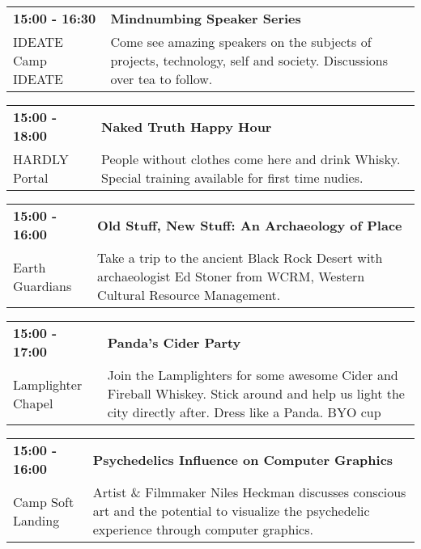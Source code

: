 \begin{tabular}{ p{1in} p{2.2in} }
    \textbf{15:00 - 16:30} & \textbf{ Mindnumbing Speaker Series} \\
    IDEATE \newline Camp IDEATE & Come see amazing speakers on the subjects of projects, technology, self and society. Discussions over tea to follow. \\
    \hline 
\end{tabular}
    
\begin{tabular}{ p{1in} p{2.2in} }
    \textbf{15:00 - 18:00} & \textbf{Naked Truth Happy Hour} \\
    HARDLY \newline 430  Portal & People without clothes come here and drink Whisky.  Special training available for first time nudies. \\
    \hline 
\end{tabular}
    
\begin{tabular}{ p{1in} p{2.2in} }
    \textbf{15:00 - 16:00} & \textbf{Old Stuff, New Stuff: An Archaeology of Place} \\
    Earth Guardians \newline  & Take a trip to the ancient Black Rock Desert with archaeologist Ed Stoner from WCRM, Western Cultural Resource Management. \\
    \hline 
\end{tabular}
    
\begin{tabular}{ p{1in} p{2.2in} }
    \textbf{15:00 - 17:00} & \textbf{Panda's Cider Party} \\
    Lamplighter Chapel \newline  & Join the Lamplighters for some awesome Cider and Fireball Whiskey. Stick around and help us light the city directly after. Dress like a Panda. BYO cup \\
    \hline 
\end{tabular}
    
\begin{tabular}{ p{1in} p{2.2in} }
    \textbf{15:00 - 16:00} & \textbf{Psychedelics Influence on Computer Graphics} \\
    Camp Soft Landing \newline  & Artist \& Filmmaker Niles Heckman discusses conscious art and the potential to visualize the psychedelic experience through computer graphics. \\
    \hline 
\end{tabular}
    
